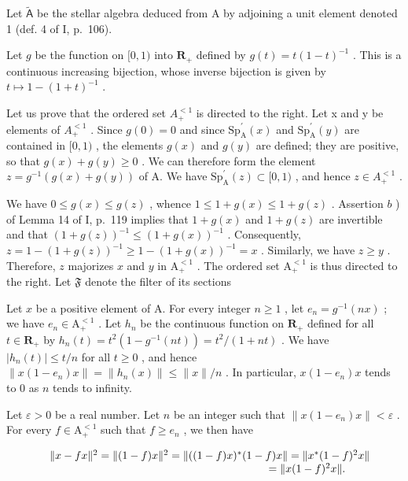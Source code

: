 Let \(\widetilde{\mathsf{A}}\) be the stellar algebra deduced from A by adjoining a unit element denoted 1 (def. 4 of I, p.~106).

Let \(g\) be the function on \([0,1)\) into \(\mathbf{R}_+\) defined by \(g(t) = t(1 - t)^{-1}\) . This is a continuous increasing bijection, whose inverse bijection is given by \(t \mapsto 1 - (1 + t)^{-1}\) .

Let us prove that the ordered set \(A_{+}^{<1}\) is directed to the right. Let x and y be elements of \(A_{+}^{<1}\) . Since \(g(0)=0\) and since \(\mathrm{Sp}_{\mathrm{A}}^{\prime}(x)\) and \(\mathrm{Sp}_{\mathrm{A}}^{\prime}(y)\) are contained in \([0,1)\) , the elements \(g(x)\) and \(g(y)\) are defined; they are positive, so that \(g(x)+g(y)\geqslant0\) . We can therefore form the element \(z=g^{-1}(g(x)+g(y))\) of A. We have \(\mathrm{Sp}_{\mathrm{A}}^{\prime}(z)\subset[0,1)\) , and hence \(z\in A_{+}^{<1}\) .

We have \(0 \leqslant g(x) \leqslant g(z)\) , whence \(1 \leqslant 1 + g(x) \leqslant 1 + g(z)\) . Assertion \(b\) ) of Lemma 14 of I, p.~119 implies that \(1 + g(x)\) and \(1 + g(z)\) are invertible and that \((1 + g(z))^{-1} \leqslant (1 + g(x))^{-1}\) . Consequently, \(z = 1 - (1 + g(z))^{-1} \geqslant 1 - (1 + g(x))^{-1} = x\) . Similarly, we have \(z \geqslant y\) . Therefore, \(z\) majorizes \(x\) and \(y\) in \(\mathrm{A}_{+}^{<1}\) . The ordered set \(\mathrm{A}_{+}^{<1}\) is thus directed to the right. Let \(\mathfrak{F}\) denote the filter of its sections

Let \(x\) be a positive element of A. For every integer \(n \geqslant 1\) , let \(e_n = g^{-1}(nx)\) ; we have \(e_n \in \mathrm{A}_+^{<1}\) . Let \(h_n\) be the continuous function on \(\mathbf{R}_+\) defined for all \(t \in \mathbf{R}_+\) by \(h_n(t) = t^2(1 - g^{-1}(nt)) = t^2 / (1 + nt)\) . We have \(|h_n(t)| \leqslant t / n\) for all \(t \geqslant 0\) , and hence \(\| x(1 - e_n)x \| = \| h_n(x) \| \leqslant \| x \| / n\) . In particular, \(x(1 - e_n)x\) tends to 0 as \(n\) tends to infinity.

Let \(\varepsilon > 0\) be a real number. Let \(n\) be an integer such that \(\|x(1 - e_n)x\| < \varepsilon\) . For every \(f \in \mathrm{A}_+^{<1}\) such that \(f \geqslant e_n\) , we then have

\[
\begin{array}{r l} & {\| x - f x \| ^ {2} = \| (1 - f) x \| ^ {2} = \| ((1 - f) x) ^ {*} (1 - f) x \| = \| x ^ {*} (1 - f) ^ {2} x \|} \\ & {\qquad \qquad \qquad \qquad \qquad \qquad \qquad \qquad \qquad \qquad = \| x (1 - f) ^ {2} x \|.} \end{array}
\]

